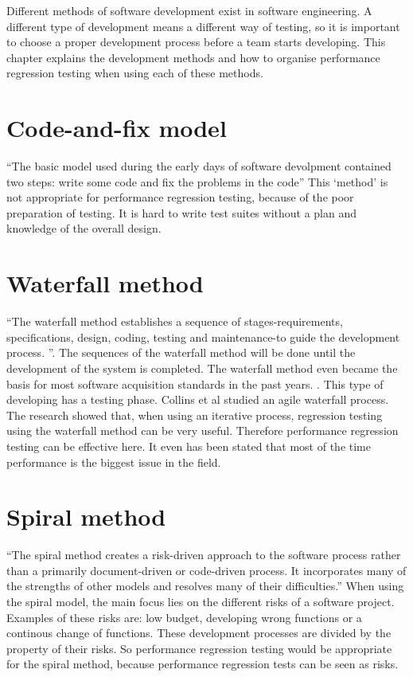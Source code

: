 Different methods of software development exist in software engineering. A different type of development means a different way of testing, so it is important to choose a proper development process before a team starts developing. This chapter explains the development methods and how to organise performance regression testing when using each of these methods.

\section{Code-and-fix model}
``The basic model used during the early days of software devolpment contained two steps: write some code and fix the problems in the code'' \cite{boehm1988spiral} This `method' is not appropriate for performance regression testing, because of the poor preparation of testing. It is hard to write test suites without a plan and knowledge of the overall design.

\section{Waterfall method}
``The waterfall method establishes a sequence of stages-requirements, specifications, design, coding, testing and maintenance-to guide the development process. ''\cite{kang1989software}. The sequences of the waterfall method will be done until the development of the system is completed. The waterfall method even became the basis for most software acquisition standards in the past years. \cite{boehm1988spiral}. This type of developing has a testing phase. Collins et al studied an agile waterfall process. \cite{collins2010iterative} The research showed that, when using an iterative process, regression testing using the waterfall method can be very useful. Therefore performance regression testing can be effective here. It even has been stated that most of the time performance is the biggest issue in the field. \cite{foo2010mining}

\section{Spiral method}
``The spiral method creates a risk-driven approach to the software process rather than a primarily document-driven or code-driven process. It incorporates many of the strengths
of other models and resolves many of their
difficulties.''\cite{boehm1988spiral} When using the spiral model, the main focus lies on the different risks of a software project. Examples of these risks are: low budget, developing wrong functions or a continous change of functions. These development processes are divided by the property of their risks. So performance regression testing would be appropriate for the spiral method, because performance regression tests can be seen as risks.

